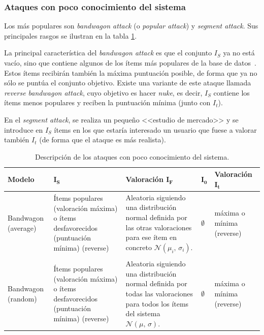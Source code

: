 \subsubsection{Ataques con poco conocimiento del sistema}

Los más populares son \textit{bandwagon attack} (o \textit{popular attack}) y \textit{segment attack}. Sus principales rasgos se ilustran en la tabla \ref{tabla_descripcion_ataques_poco_con}.

La principal característica del \textit{bandwagon attack} es que el conjunto $I_S$ ya no está vacío, sino que contiene algunos de los ítems más populares de la base de datos~\cite{zhou2021SemisupervisedRecommendationAttack}. Estos ítems recibirán también la máxima puntuación posible, de forma que ya no sólo se puntúa el conjunto objetivo. Existe una variante de este ataque llamada \textit{reverse bandwagon attack}, cuyo objetivo es hacer \textit{nuke}, es decir, $I_S$ contiene los ítems menos populares y reciben la puntuación mínima (junto con $I_t$).

En el \textit{segment attack}, se realiza un pequeño <<estudio de mercado>> y se introduce en $I_S$ ítems en los que estaría interesado un usuario que fuese a valorar también $I_t$ (de forma que el ataque es más realista).

\begin{table}
\small
\begin{centering}
	
		\begin{tabular}{@{}p{5em} p{8em} p{8em} p{2em} p{7em}@{}}
			\toprule
			\textbf{Modelo} & $\mathbf{I_S}$ & \textbf{Valoración} $\mathbf{I_F}$ & \hfil $\mathbf{I_0}$ & \textbf{Valoración} $\mathbf{I_t}$\\ 
			\midrule
			
			Bandwagon (average) & Ítems populares (valoración máxima) o ítems desfavorecidos (puntuación mínima) (reverse) & Aleatoria siguiendo una distribución normal definida por las otras valoraciones para ese ítem en concreto $\mathcal{N}(\mu_i,\,\sigma_i)$. & \hfil $\emptyset$ & máxima o mínima (reverse) \\\\
			
			Bandwagon (random) & Ítems populares (valoración máxima) o ítems desfavorecidos (puntuación mínima) (reverse) & Aleatoria siguiendo una distribución normal definida por todas las valoraciones para todos los ítems del sistema $\mathcal{N}(\mu,\,\sigma)$. & \hfil $\emptyset$ & máxima o mínima (reverse) \\
			\bottomrule
		\end{tabular}

\end{centering}
\caption[Sistemas de recomendación: ataques con poco conocimiento]{Descripción de los ataques con poco conocimiento del sistema.}
\label{tabla_descripcion_ataques_poco_con}
\end{table}


